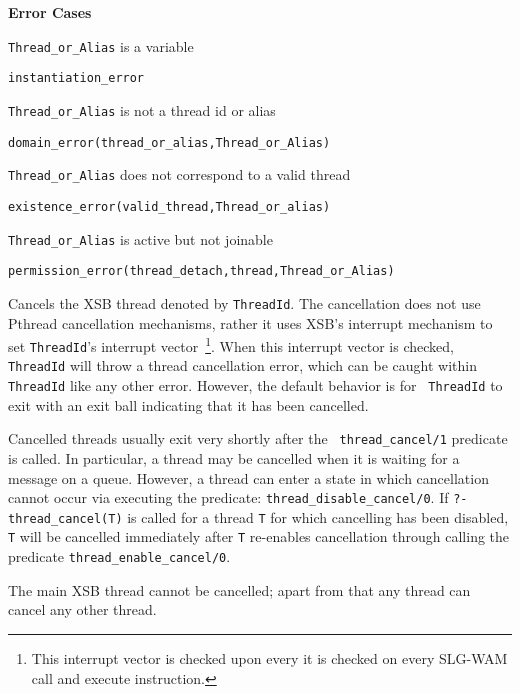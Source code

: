 \begin{description}

{\bf Error Cases}
\bi
%
\item 	{\tt Thread\_or\_Alias} is a variable
\bi
\item 	{\tt instantiation\_error}
\ei
%
\item 	{\tt Thread\_or\_Alias} is not a thread id or alias
\bi
\item 	{\tt domain\_error(thread\_or\_alias,Thread\_or\_Alias)}
\ei
%
\item   {\tt Thread\_or\_Alias} does not correspond to a valid thread
\bi
\item   {\tt existence\_error(valid\_thread,Thread\_or\_alias)}
\ei
%
\item 	{\tt Thread\_or\_Alias} is active but not joinable
\bi
\item 	{\tt permission\_error(thread\_detach,thread,Thread\_or\_Alias)}
\ei
\ei

%
Cancels the XSB thread denoted by {\tt ThreadId}.  The cancellation
does not use Pthread cancellation mechanisms, rather it uses XSB's
interrupt mechanism to set {\tt ThreadId}'s interrupt
vector~\footnote{This interrupt vector is checked upon every it is
  checked on every SLG-WAM {\sf call} and {\sf execute} instruction.}.
When this interrupt vector is checked, {\tt ThreadId} will throw a
thread cancellation error, which can be caught within {\tt ThreadId}
like any other error.  However, the default behavior is for {\tt
  ThreadId} to exit with an exit ball indicating that it has been
cancelled.  

Cancelled threads usually exit very shortly after the {\tt
  thread\_cancel/1} predicate is called.  In particular, a thread may
be cancelled when it is waiting for a message on a queue.  However, a
thread can enter a state in which cancellation cannot occur via
executing the predicate: {\tt thread\_disable\_cancel/0}.  If {\tt ?-
  thread\_cancel(T)} is called for a thread {\tt T} for which
cancelling has been disabled, {\tt T} will be cancelled immediately
after {\tt T} re-enables cancellation through calling the predicate
{\tt thread\_enable\_cancel/0}.

The main XSB thread cannot be cancelled; apart from that any thread
can cancel any other thread.


\end{description}
